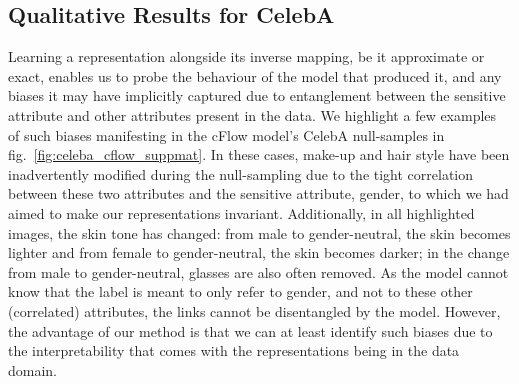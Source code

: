 \subsection{Qualitative Results for CelebA}\label{sec:qual-results-celeba}
%
\noindent Learning a representation alongside its inverse mapping, be it approximate or exact,
enables us to probe the behaviour of the model that produced it, and any biases it may have
implicitly captured due to entanglement between the sensitive attribute and other attributes
present in the data. 
%
We highlight a few examples of such biases manifesting in the \ac{cFlow} model's CelebA null-samples in
fig.~\ref{fig:celeba_cflow_suppmat}. 
%
In these cases, make-up and hair style have been inadvertently modified during the null-sampling
due to the tight correlation between these two attributes and the sensitive attribute, gender, to
which we had aimed to make our representations invariant. 
%
Additionally, in all highlighted images, the skin tone has changed: from male to gender-neutral,
the skin becomes lighter and from female to gender-neutral, the skin becomes darker; in the change
from male to gender-neutral, glasses are also often removed.
%
As the model cannot know that the label is meant to only refer to gender, and not to these other
(correlated) attributes, the links cannot be disentangled by the model.
%
However, the advantage of our method is that we can at least identify such biases due to the
interpretability that comes with the representations being in the data domain.

